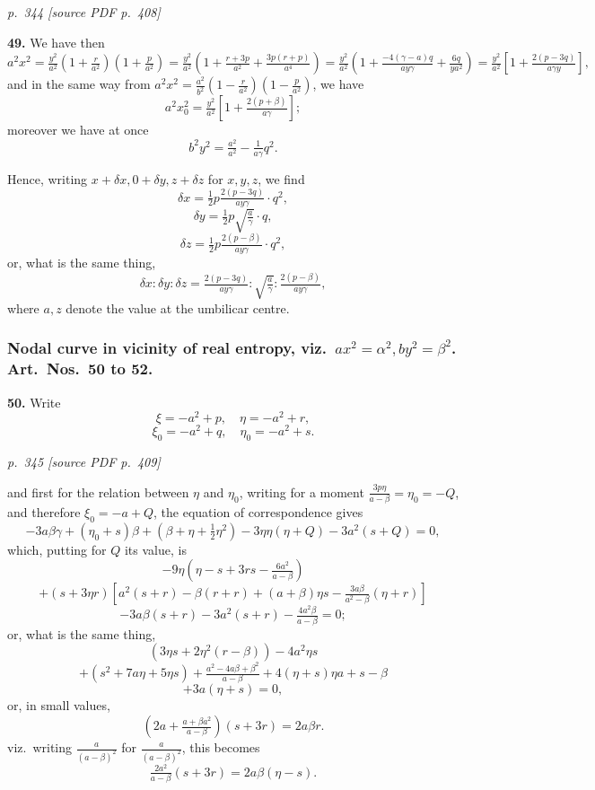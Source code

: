 \documentclass[11pt,a4paper]{article}
\newcommand{\pagemarker}[2]{\par\bigskip\noindent\textit{p.~#1 [source PDF p.~#2]}\par\smallskip}
\begin{document}
\clearpage

\bigskip
\pagemarker{344}{408}
\smallskip

\textbf{49.} We have then
\[
a^2 x^2 = \tfrac{y^2}{a^2}\!\left(1 + \tfrac{r}{a^2}\right)\!\left(1 + \tfrac{p}{a^2}\right) = \tfrac{y^2}{a^2}\!\left(1 + \tfrac{r + 3p}{a^2} + \tfrac{3p(r + p)}{a^4}\right) = \tfrac{y^2}{a^2}\!\left(1 + \tfrac{-4(\gamma - a)q}{ay\gamma} + \tfrac{6q}{y a^2}\right) = \tfrac{y^2}{a^2}\!\left[1 + \tfrac{2(p - 3q)}{a\gamma y}\right],
\]
and in the same way from $a^2 x^2 = \tfrac{a^2}{b^2}\!\left(1 - \tfrac{r}{a^2}\right)\!\left(1 - \tfrac{p}{a^2}\right)$, we have
\[
a^2 x_0^2 = \tfrac{y^2}{a^2}\!\left[1 + \tfrac{2(p + \beta)}{a\gamma}\right];
\]
moreover we have at once
\[
b^2 y^2 = \tfrac{a^2}{a^2} - \tfrac{1}{a\gamma}q^2.
\]

Hence, writing $x + \delta x, 0 + \delta y, z + \delta z$ for $x, y, z$, we find
\[
\delta x = \tfrac{1}{2}p \tfrac{2(p - 3q)}{a y\gamma}\cdot q^2,
\]
\[
\delta y = \tfrac{1}{2}p\sqrt{\tfrac{a}{\gamma}}\cdot q,
\]
\[
\delta z = \tfrac{1}{2}p \tfrac{2(p - \beta)}{a y\gamma}\cdot q^2,
\]
or, what is the same thing,
\[
\delta x : \delta y : \delta z = \tfrac{2(p - 3q)}{a y\gamma} : \sqrt{\tfrac{a}{\gamma}} : \tfrac{2(p - \beta)}{a y\gamma},
\]
where $a, z$ denote the value at the umbilicar centre.

\subsubsection*{Nodal curve in vicinity of real entropy, viz.\ $a x^2 = \alpha^2, b y^2 = \beta^2$. Art.\ Nos.\ 50 to 52.}

\textbf{50.} Write
\[
\xi = -a^2 + p,\quad \eta = -a^2 + r,
\]
\[
\xi_0 = -a^2 + q,\quad \eta_0 = -a^2 + s.
\]
\clearpage

\bigskip
\pagemarker{345}{409}
\smallskip

and first for the relation between $\eta$ and $\eta_0$, writing for a moment $\tfrac{3p\eta}{a - \beta} = \eta_0 = -Q$, and therefore $\xi_0 = -a + Q$, the equation of correspondence gives
\[
-3a\beta\gamma + (\eta_0 + s)\beta + (\beta + \eta + \tfrac{1}{2}\eta^2) - 3\eta\eta(\eta + Q) - 3a^2(s + Q) = 0,
\]
which, putting for $Q$ its value, is
\[
-9\eta(\eta - s + 3rs - \tfrac{6a^2}{a - \beta})
\]
\[
+ (s + 3\eta r)\!\left[a^2(s + r) - \beta(r + r) + (a + \beta)\eta s - \tfrac{3a\beta}{a^2 - \beta}(\eta + r)\right]
\]
\[
- 3a\beta(s + r) - 3a^2(s + r) - \tfrac{4a^2 \beta}{a - \beta} = 0;
\]
or, what is the same thing,
\[
(3\eta s + 2\eta^2(r - \beta)) - 4a^2\eta s
\]
\[
+ (s^2 + 7a\eta + 5\eta s) + \tfrac{a^2 - 4a\beta + \beta^2}{a - \beta} + 4(\eta + s)\eta a + s - \beta
\]
\[
+ 3a(\eta + s) = 0,
\]
or, in small values,
\[
\left(2a + \tfrac{a + \beta a^2}{a - \beta}\right)(s + 3r) = 2a\beta r.
\]
viz.\ writing $\tfrac{a}{(a - \beta)^2}$ for $\tfrac{a}{(a - \beta)^2}$, this becomes
\[
\tfrac{2a^2}{a - \beta}(s + 3r) = 2a\beta(\eta - s).
\]
\end{document}
